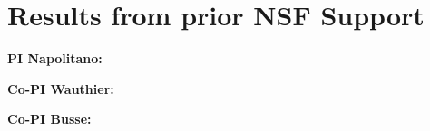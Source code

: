 \documentclass[11pt]{article}
\begin{document}
\vspace{-10pt}
\section{Results from prior NSF Support}

\noindent\textbf{PI Napolitano:}

\noindent\textbf{Co-PI Wauthier:}

\noindent\textbf{Co-PI Busse:}

\newpage

\end{document}
